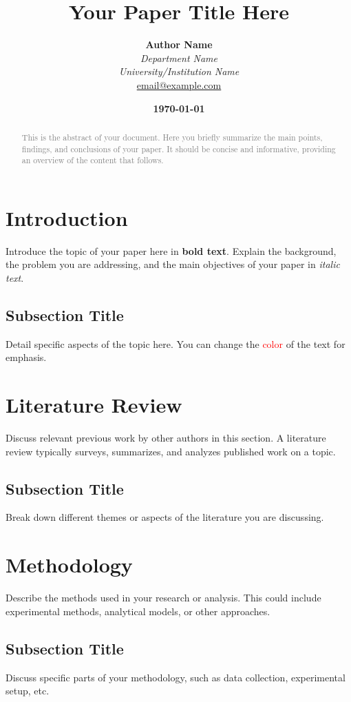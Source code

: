 \documentclass[11pt,a4paper]{article}
\title{\textbf{\Large Your Paper Title Here}}
\author{
	\textbf{Author Name} \\
	\textit{Department Name} \\
	\textit{University/Institution Name} \\
	\textcolor{blue}{\href{mailto:email@example.com}{email@example.com}} %
}
\date{\textbf{\today}} %
\begin{document}
	
	\maketitle
	
	\begin{abstract}
		\noindent %
		\textcolor{gray}{
			This is the abstract of your document. Here you briefly summarize the main points, findings, and conclusions of your paper. It should be concise and informative, providing an overview of the content that follows.
		}
	\end{abstract}
	
	\section*{Introduction}
	Introduce the topic of your paper here in \textbf{bold text}. Explain the background, the problem you are addressing, and the main objectives of your paper in \textit{italic text}.
	
	\subsection*{Subsection Title}
	Detail specific aspects of the topic here. You can change the \textcolor{red}{color} of the text for emphasis.
	
	\section*{Literature Review}
	Discuss relevant previous work by other authors in this section. A literature review typically surveys, summarizes, and analyzes published work on a topic.
	
	\subsection*{Subsection Title}
	Break down different themes or aspects of the literature you are discussing.
	
	\section*{Methodology}
	Describe the methods used in your research or analysis. This could include experimental methods, analytical models, or other approaches.
	
	\subsection*{Subsection Title}
	Discuss specific parts of your methodology, such as data collection, experimental setup, etc.
	
\end{document}
